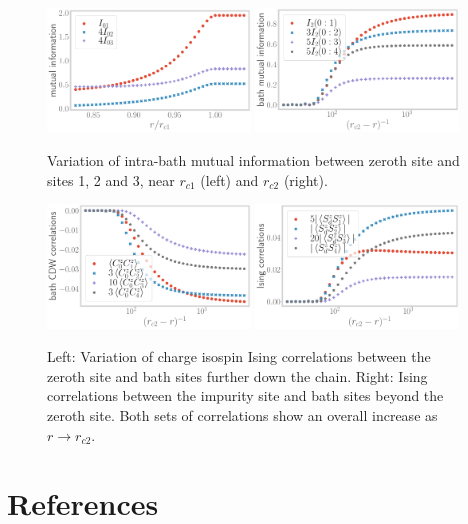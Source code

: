 \documentclass{iopart}
\begin{document}
\begin{figure}[htpb]
	\centering
	\includegraphics[width=0.48\textwidth]{Uc1-bath-mutinfo.pdf}
	\includegraphics[width=0.48\textwidth]{rc2-mut-info-bath.pdf}
	\caption{Variation of intra-bath mutual information between zeroth site and sites 1, 2 and 3, near \(r_{c1}\) (left) and \(r_{c2}\) (right).}
	\label{fig2}
\end{figure}

\begin{figure}[htpb]
	\includegraphics[width=0.48\textwidth]{rc2-charge-ising-corr-0i.pdf}
	\includegraphics[width=0.48\textwidth]{rc2-spin-ising-corr-di.pdf}
	\caption{Left: Variation of charge isospin Ising correlations between the zeroth site and bath sites further down the chain. Right: Ising correlations between the impurity site and bath sites beyond the zeroth site. Both sets of correlations show an overall increase as \(r \to r_{c2}\).}
	\label{fig3}
\end{figure}

\section*{References}


\end{document}

